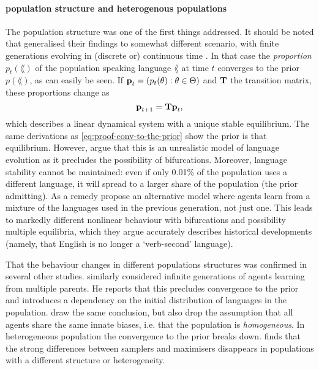\documentclass{../src/bcthesispart}
\begin{document}
\paragraph{population structure and heterogenous populations}

The population structure was one of the first things addressed.
It should be noted that \parencite{Griffiths2007a} generalised their findings to somewhat different scenario, with finite generations evolving in (discrete or) continuous time \parencite[cf.][]{Nowak2001}.
In that case the \emph{proportion} $p_t(\lang)$ of the population speaking language $\lang$ at time $t$ converges to the prior $p(\lang)$, as can easily be seen.
If $\boldsymbol{\mathbf{p}}_t = (p_t(\theta): \theta\in \Theta)$ and $\boldsymbol{\mathbf{T}}$ the transition matrix, these proportions change as
\begin{equation}
	\boldsymbol{\mathbf{p}}_{t+1} = \boldsymbol{\mathbf{T}} \boldsymbol{\mathbf{p}}_t,
\end{equation}
which describes a linear dynamical system with a unique stable equilibrium.
The same derivations as \eqref{eq:proof-conv-to-the-prior} show the prior is that equilibrium. 
However, \textcite{Niyogi2009} argue that this is an unrealistic model of language evolution as it precludes the possibility of bifurcations.
Moreover, language stability cannot be maintained: even if only 0.01\% of the population uses a different language, it will spread to a larger share of the population (the prior admitting).
As a remedy \textcite{Niyogi2009} propose an alternative model where agents learn from a mixture of the languages used in the previous generation, not just one.
This leads to markedly different nonlinear behaviour with bifurcations and possibility multiple equilibria, which they argue accurately describes historical developments (namely, that English is no longer a ‘verb-second’ language).




That the behaviour changes in different populations structures was confirmed in several other studies.
\textcite{Smith2009} similarly considered infinite generations of agents learning from multiple parents.
He reports that this precludes convergence to the prior and introduces a dependency on the initial distribution of languages in the population.
\textcite{Ferdinand2009} draw the same conclusion, but also drop the assumption that all agents share the same innate biases, i.e. that the population is \emph{homogeneous}.
In heterogeneous population the convergence to the prior breaks down.
\textcite{Dediu2009} finds that the strong differences between samplers and maximisers disappears in populations with a different structure or heterogeneity.
\end{document}
